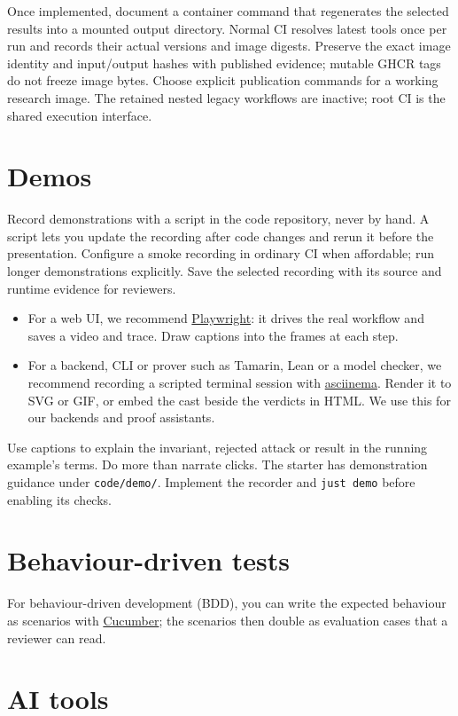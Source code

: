 Once implemented, document a container command that regenerates the selected results into a mounted output directory. Normal CI resolves latest tools once per run and records their actual versions and image digests. Preserve the exact image identity and input/output hashes with published evidence; mutable GHCR tags do not freeze image bytes. Choose explicit publication commands for a working research image. The retained nested legacy workflows are inactive; root CI is the shared execution interface.

\section{Demos}\label{guide:code:demo}
Record demonstrations with a script in the code repository, never by hand. A script lets you update the recording after code changes and rerun it before the presentation. Configure a smoke recording in ordinary CI when affordable; run longer demonstrations explicitly. Save the selected recording with its source and runtime evidence for reviewers.
\begin{itemize}[noitemsep]
  \item For a web UI, we recommend \href{https://playwright.dev/}{Playwright}: it drives the real workflow and saves a video and trace. Draw captions into the frames at each step.
  \item For a backend, CLI or prover such as Tamarin, Lean or a model checker, we recommend recording a scripted terminal session with \href{https://asciinema.org/}{asciinema}. Render it to SVG or GIF, or embed the cast beside the verdicts in HTML. We use this for our backends and proof assistants.
\end{itemize}
Use captions to explain the invariant, rejected attack or result in the running example's terms. Do more than narrate clicks. The starter has demonstration guidance under \texttt{code/demo/}. Implement the recorder and \texttt{just demo} before enabling its checks.

\section{Behaviour-driven tests}
For behaviour-driven development (BDD), you can write the expected behaviour as scenarios with \href{https://cucumber.io/}{Cucumber}; the scenarios then double as evaluation cases that a reviewer can read.

\section{AI tools}\label{guide:code:ai}
